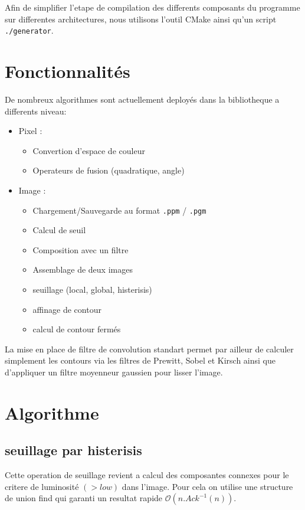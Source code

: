 Afin de simplifier l'etape de compilation des differents composants du programme sur differentes architectures, nous utilisons l'outil CMake ainsi qu'un script \texttt{./generator}.


\section*{Fonctionnalités}

De nombreux algorithmes sont actuellement deployés dans la bibliotheque a differents niveau:

\begin{itemize}
	\item Pixel :
		\begin{itemize}
			\item Convertion d'espace de couleur
			\item Operateurs de fusion (quadratique, angle)
		\end{itemize}
	\item Image :
		\begin{itemize}
			\item Chargement/Sauvegarde au format \texttt{.ppm} / \texttt{.pgm}
			\item Calcul de seuil
			\item Composition avec un filtre
			\item Assemblage de deux images
			\item seuillage (local, global, histerisis)
			\item affinage de contour
			\item calcul de contour fermés
		\end{itemize}
\end{itemize}

La mise en place de filtre de convolution standart permet par ailleur de calculer simplement les contours via les filtres de Prewitt, Sobel et Kirsch ainsi que d'appliquer un filtre moyenneur gaussien pour lisser l'image.



\section*{Algorithme}
\subsection*{seuillage par histerisis}
Cette operation de seuillage revient a calcul des composantes connexes pour le critere de luminosité $(>low)$ dans l'image. Pour cela on utilise une structure de union find qui garanti un resultat rapide $\mathcal O(n.Ack^{-1}(n))$.

